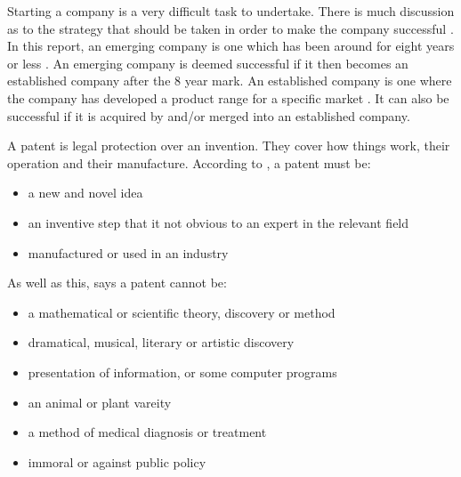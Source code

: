 {}


Starting a company is a very difficult task to undertake. 
There is much discussion as to the strategy that should be taken in order to make the company successful \cite{hsu2006venture,smith1997utility}.
In this report, an emerging company is one which has been around for eight years or less \cite{zahra1996technology}. 
An emerging company is deemed successful if it then becomes an established company after the 8 year mark.
An established company is one where the company has developed a product range for a specific market \cite{kekale2007successful}.
It can also be successful if it is acquired by and/or merged into an established company. 

A patent is legal protection over an invention.
They cover how things work, their operation and their manufacture. 
According to \cite{ipopatent}, a patent must be:
\begin{itemize}
\item a new and novel idea
\item an inventive step that it not obvious to an expert in the relevant field
\item manufactured or used in an industry
\end{itemize}

As well as this, \cite{ipopatent} says a patent cannot be:
\begin{itemize}
\item a mathematical or scientific theory, discovery or method
\item dramatical, musical, literary or artistic discovery
\item presentation of information, or some computer programs
\item an animal or plant vareity
\item a method of medical diagnosis or treatment
\item immoral or against public policy
\end{itemize}


